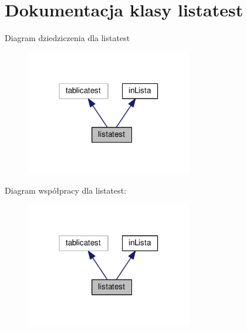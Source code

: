 \section{Dokumentacja klasy listatest}
\label{classlistatest}


Diagram dziedziczenia dla listatest
\nopagebreak
\begin{figure}[H]
\begin{center}
\leavevmode
\includegraphics[width=206pt]{classlistatest__inherit__graph}
\end{center}
\end{figure}


Diagram współpracy dla listatest\+:
\nopagebreak
\begin{figure}[H]
\begin{center}
\leavevmode
\includegraphics[width=206pt]{classlistatest__coll__graph}
\end{center}
\end{figure}
